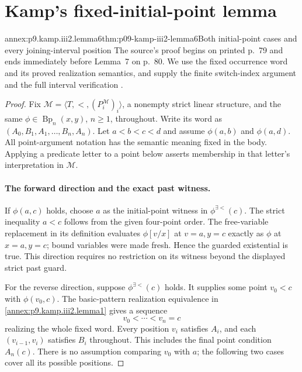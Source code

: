 
\section{Kamp's fixed-initial-point lemma}
\label{sec:annex-p09-kamp-iii2-lemma6}

\begin{annexitem}{annex:p9.kamp.iii2.lemma6}{thm:p09-kamp-iii2-lemma6}{Both initial-point cases and every joining-interval position}
The source's proof begins on printed p.~79 and ends immediately before
Lemma~7 on p.~80. We use the fixed occurrence word and its proved
realization semantics, and supply the finite switch-index argument
and the full interval verification
\cite[ch.~III, lemma~6, pp.~79--80]{Kamp1968}.

\begin{proof}
Fix \(\mathcal M=\langle T,<,(P_i^{\mathcal M})_i\rangle\), a
nonempty strict linear structure, and the same
\(\phi\in\operatorname{Bp}_n(x,y)\), \(n\geq1\), throughout.
Write its word as \((A_0,B_1,A_1,\ldots,B_n,A_n)\).
Let \(a<b<c<d\) and assume \(\phi(a,b)\) and \(\phi(a,d)\).
All point-argument notation has the semantic meaning fixed in the body.
Applying a predicate letter to a point below asserts membership in
that letter's interpretation in \(\mathcal M\).

\paragraph{The forward direction and the exact past witness.}
If \(\phi(a,c)\) holds, choose \(a\) as the initial-point witness
in \(\phi^{\exists<}(c)\). The strict inequality \(a<c\) follows
from the given four-point order. The free-variable replacement in its
definition evaluates \(\phi[v/x]\) at \(v=a,y=c\) exactly as
\(\phi\) at \(x=a,y=c\); bound variables were made fresh.
Hence the guarded existential is true. This direction requires no
restriction on its witness beyond the displayed strict past guard.

For the reverse direction, suppose \(\phi^{\exists<}(c)\) holds.
It supplies some point \(v_0<c\) with \(\phi(v_0,c)\).
The basic-pattern realization equivalence in
\cref{annex:p9.kamp.iii2.lemma1} gives a sequence
\[
                           v_0<\cdots<v_n=c
\]
realizing the whole fixed word. Every position \(v_i\) satisfies
\(A_i\), and each \((v_{i-1},v_i)\) satisfies \(B_i\)
throughout. This includes the final point condition \(A_n(c)\).
There is no assumption comparing \(v_0\) with \(a\); the following
two cases cover all its possible positions.


\end{proof}
\end{annexitem}
